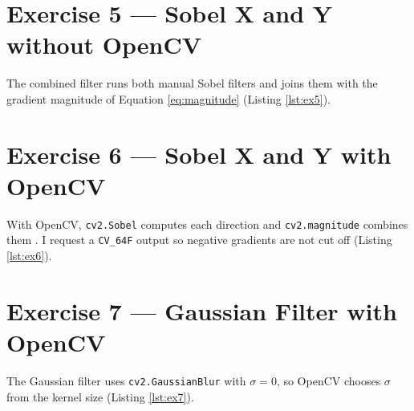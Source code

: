 


\section{Exercise 5 --- Sobel X and Y without OpenCV}
\label{sec:ex5}

The combined filter runs both manual Sobel filters and joins them with
the gradient magnitude of Equation \ref{eq:magnitude} (Listing
\ref{lst:ex5}).




\section{Exercise 6 --- Sobel X and Y with OpenCV}
\label{sec:ex6}

With OpenCV, \texttt{cv2.Sobel} computes each direction and
\texttt{cv2.magnitude} combines them \citep{opencvfilters}. I request a
\texttt{CV\_64F} output so negative gradients are not cut off (Listing
\ref{lst:ex6}).




\section{Exercise 7 --- Gaussian Filter with OpenCV}
\label{sec:ex7}

The Gaussian filter uses \texttt{cv2.GaussianBlur} with $\sigma = 0$,
so OpenCV chooses $\sigma$ from the kernel size (Listing \ref{lst:ex7}).




